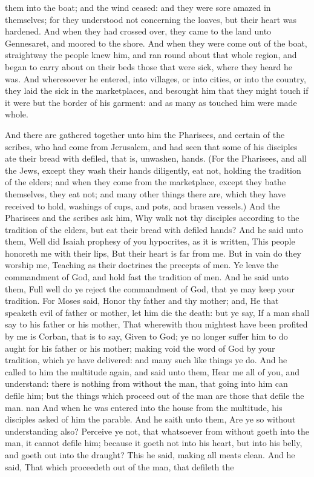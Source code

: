 them into the boat; and the wind ceased: and they were sore amazed in themselves; for they understood not concerning the loaves, but their heart was hardened.  And when they had crossed over, they came to the land unto Gennesaret, and moored to the shore. And when they were come out of the boat, straightway the people knew him, and ran round about that whole region, and began to carry about on their beds those that were sick, where they heard he was. And wheresoever he entered, into villages, or into cities, or into the country, they laid the sick in the marketplaces, and besought him that they might touch if it were but the border of his garment: and as many as touched him were made whole. 

And there are gathered together unto him the Pharisees, and certain of the scribes, who had come from Jerusalem, and had seen that some of his disciples ate their bread with defiled, that is, unwashen, hands. (For the Pharisees, and all the Jews, except they wash their hands diligently, eat not, holding the tradition of the elders; and when they come from the marketplace, except they bathe themselves, they eat not; and many other things there are, which they have received to hold, washings of cups, and pots, and brasen vessels.) And the Pharisees and the scribes ask him, Why walk not thy disciples according to the tradition of the elders, but eat their bread with defiled hands? And he said unto them, Well did Isaiah prophesy of you hypocrites, as it is written, This people honoreth me with their lips, But their heart is far from me.  But in vain do they worship me, Teaching as their doctrines the precepts of men.  Ye leave the commandment of God, and hold fast the tradition of men. And he said unto them, Full well do ye reject the commandment of God, that ye may keep your tradition. For Moses said, Honor thy father and thy mother; and, He that speaketh evil of father or mother, let him die the death: but ye say, If a man shall say to his father or his mother, That wherewith thou mightest have been profited by me is Corban, that is to say, Given to God; ye no longer suffer him to do aught for his father or his mother; making void the word of God by your tradition, which ye have delivered: and many such like things ye do. And he called to him the multitude again, and said unto them, Hear me all of you, and understand: there is nothing from without the man, that going into him can defile him; but the things which proceed out of the man are those that defile the man. nan And when he was entered into the house from the multitude, his disciples asked of him the parable. And he saith unto them, Are ye so without understanding also? Perceive ye not, that whatsoever from without goeth into the man, it cannot defile him; because it goeth not into his heart, but into his belly, and goeth out into the draught? This he said, making all meats clean. And he said, That which proceedeth out of the man, that defileth the 